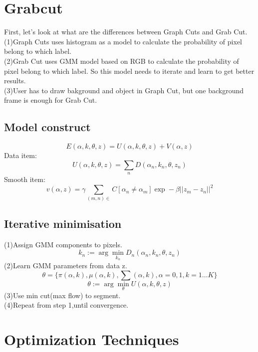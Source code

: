 \documentclass{article}
\begin{document}
\section{Grabcut}
First, let's look at what are the differences between Graph Cuts and Grab Cut.\\
(1)Graph Cuts uses histogram as a model to calculate the probability of pixel belong to which label.\\
(2)Grab Cut uses GMM model based on RGB to calculate the probability of pixel belong to which label. So this model needs to iterate and learn to get better results.\\
(3)User has to draw bakground and object in Graph Cut, but one background frame is enough for Grab Cut.\\
\subsection{Model construct}
\begin{equation}\label{key}
E(\alpha,k,\theta,z)=U(\alpha,k,\theta,z)+V(\alpha,z)
\end{equation}
Data item:
$$
U(\alpha,k,\theta,z)=\sum_{n}D(\alpha_n,k_n,\theta,z_n)
$$
Smooth item:
$$
v(\alpha,z)=\gamma\sum_{(m,n)\in}C[\alpha_n\neq\alpha_m]\exp-\beta||z_m-z_n||^2
$$
\subsection{Iterative minimisation}
(1)Assign GMM components to pixels.\\
$$
k_n:=\arg\min_{k_n}D_n(\alpha_n,k_n,\theta,z_n)
$$
(2)Learn GMM parameters from data z.\\
$$
\theta=\{\pi(\alpha,k),\mu(\alpha,k),\sum(\alpha,k),\alpha=0,1,k=1\dots K\}
$$
$$
\theta:=\arg\min_{\theta} U(\alpha,k,\theta,z)
$$
(3)Use min cut(max flow) to segment.\\
(4)Repeat from step 1,until convergence.
\section{Optimization Techniques}
\end{document}
